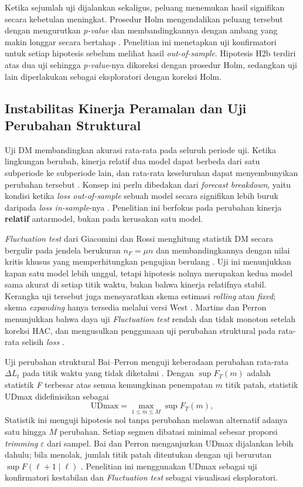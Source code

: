 Ketika sejumlah uji dijalankan sekaligus, peluang menemukan hasil signifikan
secara kebetulan meningkat. Prosedur Holm mengendalikan peluang tersebut dengan
mengurutkan \textit{p-value} dan membandingkannya dengan ambang yang makin
longgar secara bertahap \cite{holm1979}. Penelitian ini menetapkan uji
konfirmatori untuk setiap hipotesis sebelum melihat hasil
\textit{out-of-sample}. Hipotesis H2b terdiri atas dua uji sehingga
\textit{p-value}-nya dikoreksi dengan prosedur Holm, sedangkan uji lain
diperlakukan sebagai eksploratori dengan koreksi Holm.


\subsection{Instabilitas Kinerja Peramalan dan Uji Perubahan Struktural}
Uji DM membandingkan akurasi rata-rata pada seluruh periode uji. Ketika
lingkungan berubah, kinerja relatif dua model dapat berbeda dari satu
subperiode ke subperiode lain, dan rata-rata keseluruhan dapat menyembunyikan
perubahan tersebut \cite{rossi2013}. Konsep ini perlu dibedakan dari
\textit{forecast breakdown}, yaitu kondisi ketika \textit{loss out-of-sample}
sebuah model secara signifikan lebih buruk daripada \textit{loss in-sample}-nya
\cite{giacomini2009}. Penelitian ini berfokus pada perubahan kinerja
\textbf{relatif} antarmodel, bukan pada kerusakan satu model.

\textit{Fluctuation test} dari Giacomini dan Rossi menghitung statistik DM
secara bergulir pada jendela berukuran $n_F = \mu n$ dan membandingkannya dengan
nilai kritis khusus yang memperhitungkan pengujian berulang
\cite{giacomini2010}. Uji ini menunjukkan kapan satu model lebih unggul, tetapi
hipotesis nolnya merupakan kedua model sama akurat di setiap titik waktu,
bukan bahwa kinerja relatifnya stabil. Kerangka uji tersebut juga mensyaratkan
skema estimasi \textit{rolling} atau \textit{fixed}; skema \textit{expanding}
hanya tersedia melalui versi West \cite{giacomini2010}. Martins dan Perron menunjukkan bahwa daya uji
\textit{Fluctuation test} rendah dan tidak monoton setelah koreksi HAC, dan
mengusulkan penggunaan uji perubahan struktural pada rata-rata selisih
\textit{loss} \cite{martins2016}.

Uji perubahan struktural Bai--Perron menguji keberadaan perubahan rata-rata
$\Delta L_t$ pada titik waktu yang tidak diketahui \cite{bai1998}. Dengan
$\sup F_T(m)$ adalah statistik \textit{F} terbesar atas semua kemungkinan
penempatan $m$ titik patah, statistik UDmax didefinisikan sebagai
\begin{equation}
  \text{UDmax} = \max_{1 \le m \le M} \sup F_T(m),
  \label{eq:udmax}
\end{equation}
Statistik ini menguji hipotesis nol tanpa perubahan melawan alternatif adanya
satu hingga $M$ perubahan. Setiap segmen dibatasi minimal sebesar proporsi
\textit{trimming} $\varepsilon$ dari sampel. Bai dan Perron menganjurkan UDmax
dijalankan lebih dahulu; bila menolak, jumlah titik patah ditentukan dengan uji
berurutan $\sup F(\ell+1 \mid \ell)$ \cite{bai2003}. Penelitian ini menggunakan
UDmax sebagai uji konfirmatori kestabilan dan \textit{Fluctuation test} sebagai
visualisasi eksploratori.



